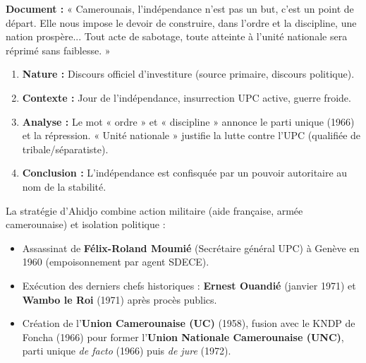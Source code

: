 \documentclass[11pt]{article}
\begin{document}
\begin{experience}
\textbf{Document :} « Camerounais, l'indépendance n'est pas un but, c'est un point de départ. Elle nous impose le devoir de construire, dans l'ordre et la discipline, une nation prospère... Tout acte de sabotage, toute atteinte à l'unité nationale sera réprimé sans faiblesse. »
\begin{enumerate}
    \item \textbf{Nature :} Discours officiel d'investiture (source primaire, discours politique).
    \item \textbf{Contexte :} Jour de l'indépendance, insurrection UPC active, guerre froide.
    \item \textbf{Analyse :} Le mot « ordre » et « discipline » annonce le parti unique (1966) et la répression. « Unité nationale » justifie la lutte contre l'UPC (qualifiée de tribale/séparatiste).
    \item \textbf{Conclusion :} L'indépendance est confisquée par un pouvoir autoritaire au nom de la stabilité.
\end{enumerate}
\end{experience}

\noindent La stratégie d'Ahidjo combine action militaire (aide française, armée camerounaise) et isolation politique :
\begin{itemize}
    \item Assassinat de \textbf{Félix-Roland Moumié} (Secrétaire général UPC) à Genève en 1960 (empoisonnement par agent SDECE).
    \item Exécution des derniers chefs historiques : \textbf{Ernest Ouandié} (janvier 1971) et \textbf{Wambo le Roi} (1971) après procès publics.
    \item Création de l'\textbf{Union Camerounaise (UC)} (1958), fusion avec le KNDP de Foncha (1966) pour former l'\textbf{Union Nationale Camerounaise (UNC)}, parti unique \emph{de facto} (1966) puis \emph{de jure} (1972).
\end{itemize}
\end{document}
